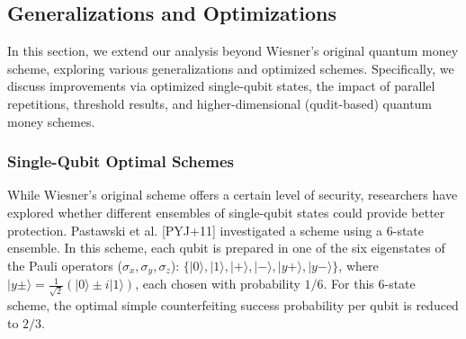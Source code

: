 \documentclass{article} %
\begin{document}



\subsection{Generalizations and Optimizations}

In this section, we extend our analysis beyond Wiesner’s original quantum money scheme, exploring various generalizations and optimized schemes. Specifically, we discuss improvements via optimized single-qubit states, the impact of parallel repetitions, threshold results, and higher-dimensional (qudit-based) quantum money schemes.

\subsubsection{Single-Qubit Optimal Schemes}

While Wiesner's original scheme offers a certain level of security, researchers have explored whether different ensembles of single-qubit states could provide better protection.
Pastawski et al. [PYJ+11] investigated a scheme using a 6-state ensemble. In this scheme, each qubit is prepared in one of the six eigenstates of the Pauli operators ($\sigma_x, \sigma_y, \sigma_z$): $\{|0\rangle, |1\rangle, |+\rangle, |-\rangle, |y+\rangle, |y-\rangle\}$, where $|y\pm\rangle = \frac{1}{\sqrt{2}}(|0\rangle \pm i|1\rangle)$, each chosen with probability $1/6$. For this 6-state scheme, the optimal simple counterfeiting success probability per qubit is reduced to $2/3$.
\end{document}
